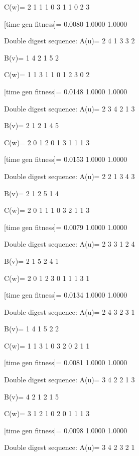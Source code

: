 C(w)=
     2     1     1     1     0     3     1     1     0     2     3

[time gen fitness]=
    0.0080    1.0000    1.0000

Double digest sequence:
A(u)=
     2     4     1     3     3     2

B(v)=
     1     4     2     1     5     2

C(w)=
     1     1     3     1     1     0     1     2     3     0     2

[time gen fitness]=
    0.0148    1.0000    1.0000

Double digest sequence:
A(u)=
     2     3     4     2     1     3

B(v)=
     2     1     2     1     4     5

C(w)=
     2     0     1     2     0     1     3     1     1     1     3

[time gen fitness]=
    0.0153    1.0000    1.0000

Double digest sequence:
A(u)=
     2     2     1     3     4     3

B(v)=
     2     1     2     5     1     4

C(w)=
     2     0     1     1     1     0     3     2     1     1     3

[time gen fitness]=
    0.0079    1.0000    1.0000

Double digest sequence:
A(u)=
     2     3     3     1     2     4

B(v)=
     2     1     5     2     4     1

C(w)=
     2     0     1     2     3     0     1     1     1     3     1

[time gen fitness]=
    0.0134    1.0000    1.0000

Double digest sequence:
A(u)=
     2     4     3     2     3     1

B(v)=
     1     4     1     5     2     2

C(w)=
     1     1     3     1     0     3     2     0     2     1     1

[time gen fitness]=
    0.0081    1.0000    1.0000

Double digest sequence:
A(u)=
     3     4     2     2     1     3

B(v)=
     4     2     1     2     1     5

C(w)=
     3     1     2     1     0     2     0     1     1     1     3

[time gen fitness]=
    0.0098    1.0000    1.0000

Double digest sequence:
A(u)=
     3     4     2     3     2     1

